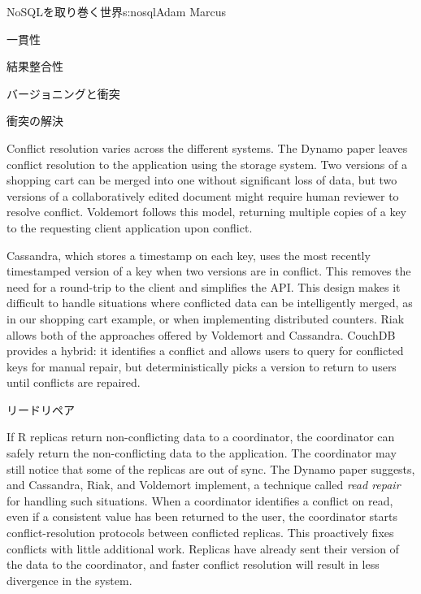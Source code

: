 \begin{aosachapter}{NoSQLを取り巻く世界}{s:nosql}{Adam Marcus}
\begin{aosasect1}{一貫性}
\begin{aosasect2}{結果整合性}
\begin{aosasect3}{バージョニングと衝突}
\end{aosasect3}

\begin{aosasect3}{衝突の解決}

Conflict resolution varies across the different systems.  The Dynamo
paper leaves conflict resolution to the application using the
storage system.  Two versions of a shopping cart can be merged into
one without significant loss of data, but two versions of a
collaboratively edited document might require human reviewer to
resolve conflict.  Voldemort follows this model, returning multiple
copies of a key to the requesting client application upon conflict.

Cassandra, which stores a timestamp on each key, uses the most
recently timestamped version of a key when two versions are in
conflict.  This removes the need for a round-trip to the client and
simplifies the API. This design makes it difficult to handle
situations where conflicted data can be intelligently merged, as in
our shopping cart example, or when implementing distributed counters.
Riak allows both of the approaches offered by Voldemort and Cassandra.
CouchDB provides a hybrid: it identifies a conflict and allows users
to query for conflicted keys for manual repair, but deterministically
picks a version to return to users until conflicts are repaired.

\end{aosasect3}

\begin{aosasect3}{リードリペア}

If R replicas return non-conflicting data to a coordinator, the
coordinator can safely return the non-conflicting data to the
application.  The coordinator may still notice that some of the
replicas are out of sync.  The Dynamo paper suggests, and Cassandra,
Riak, and Voldemort implement, a technique called \emph{read repair}
for handling such situations.  When a coordinator identifies a
conflict on read, even if a consistent value has been returned to the
user, the coordinator starts conflict-resolution protocols between
conflicted replicas.  This proactively fixes conflicts with little
additional work.  Replicas have already sent their version of the data to
the coordinator, and faster conflict resolution will result in less
divergence in the system.

\end{aosasect3}


\end{aosasect2}
\end{aosasect1}
\end{aosachapter}
